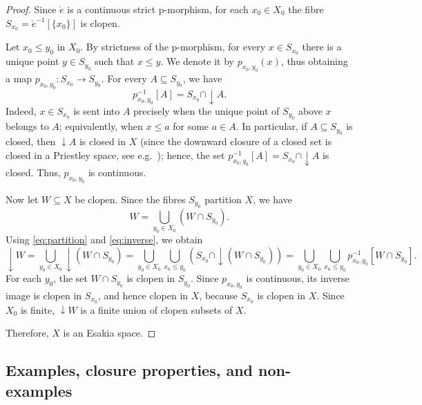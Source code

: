 \documentclass[12pt]{amsart}
\theoremstyle{plain}
\theoremstyle{definition}
\renewcommand{\d}{{\downarrow}}
\begin{document}
\begin{proof}
    Since $\acute{e}$ is a continuous strict p-morphism, for each $x_{0}\in X_{0}$ the fibre $S_{x_{0}}=\acute{e}^{-1}[\{x_{0}\}]$ is clopen.
    
    Let $x_{0}\leq y_{0}$ in $X_{0}$. By strictness of the p-morphism, for every $x\in S_{x_{0}}$ there is a unique point $y\in S_{y_{0}}$ such that $x\leq y$. We denote it by $p_{x_{0},y_{0}}(x)$, thus obtaining a map $p_{x_{0},y_{0}}\colon S_{x_{0}}\to S_{y_{0}}$.
    For every $A\subseteq S_{y_{0}}$, we have
    \begin{equation} \label{eq:inverse}
        p_{x_{0},y_{0}}^{-1}[A]
        =
        S_{x_{0}}\cap {\downarrow}A.
    \end{equation}
    Indeed, $x\in S_{x_{0}}$ is sent into $A$ precisely when the unique point of $S_{y_{0}}$ above $x$ belongs to $A$; equivalently, when $x\leq a$ for some $a\in A$.
    In particular, if $A\subseteq S_{y_{0}}$ is closed, then $\d A$ is closed in $X$ (since the downward closure of a closed set is closed in a Priestley space, see e.g.\ \cite[Exercise~3.2.7.b]{Gehrke2024}); hence, the set $p_{x_{0},y_{0}}^{-1}[A] = S_{x_{0}}\cap {\downarrow}A$ is closed. Thus, $p_{x_{0},y_{0}}$ is continuous.
    
    Now let $W\subseteq X$ be clopen. Since the fibres $S_{y_{0}}$ partition $X$, we have
    \begin{equation}\label{eq:partition}
        W=\bigcup_{y_{0}\in X_{0}}(W\cap S_{y_{0}}).
    \end{equation}
    Using \eqref{eq:partition} and \eqref{eq:inverse}, we obtain
    \[
        {\downarrow}W =  \bigcup_{y_{0}\in X_{0}}\d (W\cap S_{y_{0}}) =
        \bigcup_{y_{0}\in X_{0}}
        \bigcup_{x_{0}\leq y_{0}}
        \left(S_{x_{0}}\cap {\downarrow}(W\cap S_{y_{0}})\right)
        =
        \bigcup_{y_{0}\in X_{0}}
        \bigcup_{x_{0}\leq y_{0}}
        p_{x_{0},y_{0}}^{-1}[W\cap S_{y_{0}}].
    \]
    For each $y_{0}$, the set $W\cap S_{y_{0}}$ is clopen in
    $S_{y_{0}}$. Since $p_{x_{0},y_{0}}$ is continuous, its inverse image
    is clopen in $S_{x_{0}}$, and hence clopen in $X$, because
    $S_{x_{0}}$ is clopen in $X$. Since $X_{0}$ is finite,
    ${\downarrow}W$ is a finite union of clopen subsets of $X$.
    
    Therefore, $X$ is an Esakia space.
\end{proof}


\subsection{Examples, closure properties, and non-examples}
\end{document}
